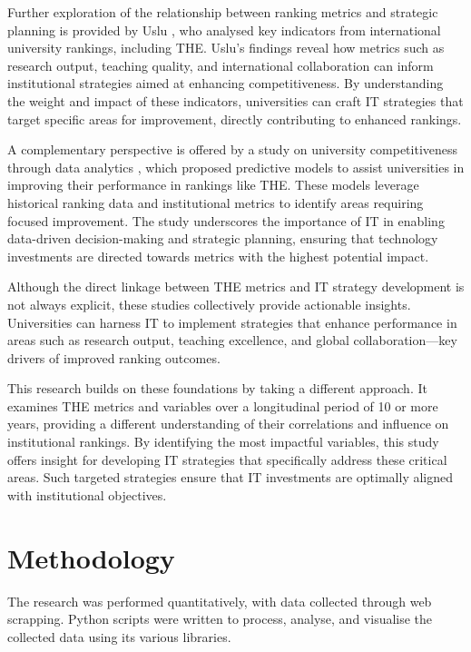 \documentclass[conference]{IEEEtran}
\begin{document}
Further exploration of the relationship between ranking metrics and strategic planning is provided by Uslu \cite{uslu2020university}, who analysed key indicators from international university rankings, including THE. Uslu's findings reveal how metrics such as research output, teaching quality, and international collaboration can inform institutional strategies aimed at enhancing competitiveness. By understanding the weight and impact of these indicators, universities can craft IT strategies that target specific areas for improvement, directly contributing to enhanced rankings.

A complementary perspective is offered by a study on university competitiveness through data analytics \cite{analytics2022competitiveness}, which proposed predictive models to assist universities in improving their performance in rankings like THE. These models leverage historical ranking data and institutional metrics to identify areas requiring focused improvement. The study underscores the importance of IT in enabling data-driven decision-making and strategic planning, ensuring that technology investments are directed towards metrics with the highest potential impact.

Although the direct linkage between THE metrics and IT strategy development is not always explicit, these studies collectively provide actionable insights. Universities can harness IT to implement strategies that enhance performance in areas such as research output, teaching excellence, and global collaboration—key drivers of improved ranking outcomes.

This research builds on these foundations by taking a different approach. It examines THE metrics and variables over a longitudinal period of 10 or more years, providing a different understanding of their correlations and influence on institutional rankings. By identifying the most impactful variables, this study offers insight for developing IT strategies that specifically address these critical areas. Such targeted strategies ensure that IT investments are optimally aligned with institutional objectives.


\section{Methodology}
\label{sec:methodology}

The research was performed quantitatively, with data collected through web scrapping. Python scripts were written to process, analyse, and visualise the collected data using its various libraries. 
\end{document}

